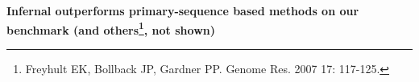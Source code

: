 \documentclass[landscape]{slides}
\begin{document}
\begin{slide}
\begin{center}

\textbf{Infernal outperforms primary-sequence based methods on our
  benchmark (and others\footnote{Freyhult EK, Bollback JP, Gardner
    PP. Genome Res. 2007 17: 117-125.}, not shown)}

\end{center}
\medskip


\vfill 
\end{slide}
\begin{slide}
\end{slide}
\end{document}
